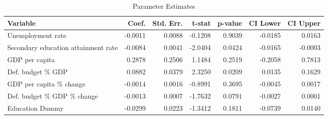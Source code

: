 \begin{table}[htbp]
\centering
\begin{threeparttable}
\caption{Parameter Estimates}
\label{tab:parameter_estimates}
\begin{tabularx}{\textwidth}{@{}Xrrrrrr@{}}
\toprule
\textbf{Variable} & \textbf{Coef.} & \textbf{Std. Err.} & \textbf{t-stat} & \textbf{p-value} & \textbf{CI Lower} & \textbf{CI Upper} \\
\midrule
Unemployment rate & -0.0011 & 0.0088 & -0.1208 & 0.9039 & -0.0185 & 0.0163 \\
Secondary education attainment rate & -0.0084 & 0.0041 & -2.0404 & 0.0424 & -0.0165 & -0.0003 \\
GDP per capita & 0.2878 & 0.2506 & 1.1484 & 0.2519 & -0.2058 & 0.7813 \\
Def. budget \% GDP & 0.0882 & 0.0379 & 2.3250 & 0.0209 & 0.0135 & 0.1629 \\
GDP per capita \% change & -0.0014 & 0.0016 & -0.8991 & 0.3695 & -0.0045 & 0.0017 \\
Def. budget \% GDP \% change & -0.0013 & 0.0007 & -1.7632 & 0.0791 & -0.0027 & 0.0001 \\
Education Dummy & -0.0299 & 0.0223 & -1.3412 & 0.1811 & -0.0739 & 0.0140 \\
\bottomrule
\end{tabularx}
\end{threeparttable}
\label{tab:final_model}
\end{table}
